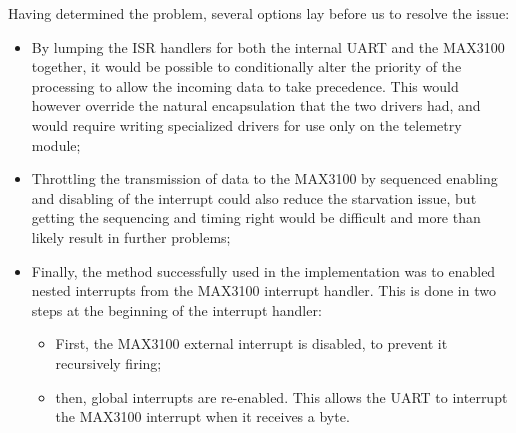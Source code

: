 Having determined the problem, several options lay before us to resolve the issue:
\begin{itemize}
  \item By lumping the ISR handlers for both the internal UART and the MAX3100 together, it would be possible to conditionally alter the priority of the processing to allow the incoming data to take precedence. This would however override the natural encapsulation that the two drivers had, and would require writing specialized drivers for use only on the telemetry module;
  \item Throttling the transmission of data to the MAX3100 by sequenced enabling and disabling of the interrupt could also reduce the starvation issue, but getting the sequencing and timing right would be difficult and more than likely result in further problems;
  \item Finally, the method successfully used in the implementation was to enabled nested interrupts from the MAX3100 interrupt handler. This is done in two steps at the beginning of the interrupt handler:
  \begin{itemize}
   \item First, the MAX3100 external interrupt is disabled, to prevent it recursively firing;
    \item then, global interrupts are re-enabled. This allows the UART to interrupt the MAX3100 interrupt when it receives a byte.
  \end{itemize}
\end{itemize}